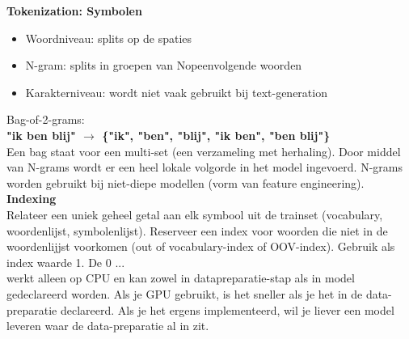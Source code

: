 {\noindent \textbf{Tokenization: Symbolen}
\begin{itemize}
    \item Woordniveau: splits op de spaties
    \item N-gram: splits in groepen van Nopeenvolgende woorden
    \item Karakterniveau: wordt niet vaak gebruikt bij text-generation
\end{itemize}
Bag-of-2-grams:\\
\textbf{"ik ben blij" $\rightarrow$ \{"ik", "ben", "blij", "ik ben", "ben blij"\}}\\
Een bag staat voor een multi-set (een verzameling met herhaling). Door middel van N-grams wordt er een heel lokale volgorde in het model ingevoerd. N-grams worden gebruikt bij niet-diepe modellen (vorm van feature engineering).\\

\textbf{Indexing}\\
Relateer een uniek geheel getal aan elk symbool uit de trainset (vocabulary, woordenlijst, symbolenlijst). Reserveer een index voor woorden die niet in de woordenlijjst voorkomen (out of vocabulary-index of OOV-index). Gebruik als index waarde 1. De 0 ...\\

 werkt alleen op CPU en kan zowel in datapreparatie-stap als in model gedeclareerd worden. Als je GPU gebruikt, is het sneller als je het in de data-preparatie declareerd. Als je het ergens implementeerd, wil je liever een model leveren waar de data-preparatie al in zit.\\

}
